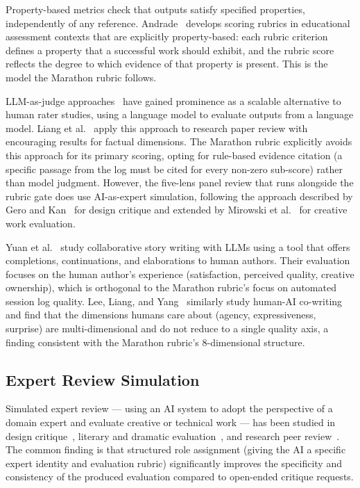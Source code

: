 Property-based metrics check that outputs satisfy specified properties, independently
of any reference. Andrade~\cite{andrade2000} develops scoring rubrics in educational
assessment contexts that are explicitly property-based: each rubric criterion defines
a property that a successful work should exhibit, and the rubric score reflects the
degree to which evidence of that property is present. This is the model the Marathon
rubric follows.

LLM-as-judge approaches~\cite{zheng2023judging} have gained prominence as a scalable
alternative to human rater studies, using a language model to evaluate outputs from a
language model. Liang et al.~\cite{liang2023} apply this approach to research paper
review with encouraging results for factual dimensions. The Marathon rubric explicitly
avoids this approach for its primary scoring, opting for rule-based evidence citation
(a specific passage from the log must be cited for every non-zero sub-score) rather
than model judgment. However, the five-lens panel review that runs alongside the rubric
gate does use AI-as-expert simulation, following the approach described by Gero and
Kan~\cite{gero2004} for design critique and extended by Mirowski et al.~\cite{mirowski2023}
for creative work evaluation.

Yuan et al.~\cite{yuan2022wordcraft} study collaborative story writing with LLMs using
a tool that offers completions, continuations, and elaborations to human authors.
Their evaluation focuses on the human author's experience (satisfaction, perceived
quality, creative ownership), which is orthogonal to the Marathon rubric's focus on
automated session log quality. Lee, Liang, and Yang~\cite{lee2022coauthor} similarly
study human-AI co-writing and find that the dimensions humans care about (agency,
expressiveness, surprise) are multi-dimensional and do not reduce to a single
quality axis, a finding consistent with the Marathon rubric's 8-dimensional structure.

\subsection{Expert Review Simulation}

Simulated expert review --- using an AI system to adopt the perspective of a domain
expert and evaluate creative or technical work --- has been studied in design
critique~\cite{gero2004}, literary and dramatic evaluation~\cite{mirowski2023}, and
research peer review~\cite{liang2023}. The common finding is that structured role
assignment (giving the AI a specific expert identity and evaluation rubric) significantly
improves the specificity and consistency of the produced evaluation compared to open-ended
critique requests.

